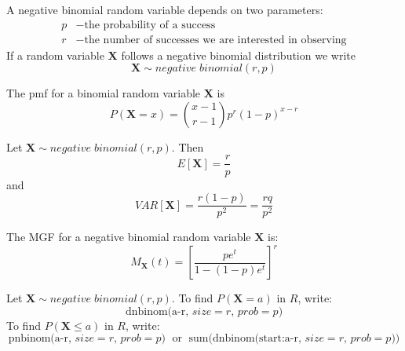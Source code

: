 \documentclass[12pt]{report}
\begin{document}
\begin{defn}{}{}
    A negative binomial random variable depends on two parameters: \begin{align*}
        p &- \text{the probability of a success} \\
        r &- \text{the number of successes we are interested in observing}
    \end{align*}
    If a random variable $\mathbf{X}$ follows a negative binomial distribution we write $$\mathbf{X}\sim negative\;binomial(r,p)$$
\end{defn}

\begin{defn}{}{}
    The pmf for a binomial random variable $\mathbf{X}$ is \begin{equation*}
        P(\mathbf{X} = x) = \binom{x-1}{r-1}p^r(1-p)^{x-r} 
    \end{equation*}
\end{defn}

\begin{defn}{}{}
    Let $\mathbf{X}\sim negative\;binomial(r,p)$. Then \begin{equation*}
        E[\mathbf{X}] = \frac{r}{p}
    \end{equation*}
    and
    \begin{equation*}
        VAR[\mathbf{X}] = \frac{r(1-p)}{p^2} = \frac{rq}{p^2}
    \end{equation*}
\end{defn}


\begin{defn}{}{}
    The MGF for a negative binomial random variable $\mathbf{X}$ is: \begin{equation*}
        M_{\mathbf{X}}(t) = \left[\frac{pe^t}{1-(1-p)e^t}\right]^r
    \end{equation*}
\end{defn}

\begin{defn}{}{}
    Let $\mathbf{X}\sim negative\;binomial(r,p)$. To find $P(\mathbf{X} = a)$ in $R$, write: \begin{equation*}
        \text{dnbinom(a-r, $size = r$, $prob = p$)}
    \end{equation*}
    To find $P(\mathbf{X} \leq a)$ in $R$, write: \begin{equation*}
        \text{pnbinom(a-r, $size = r$, $prob = p$)}\;\text{ or }\;\text{sum(dnbinom(start:a-r, $size = r$, $prob = p$))}
    \end{equation*}
\end{defn}
\end{document}
